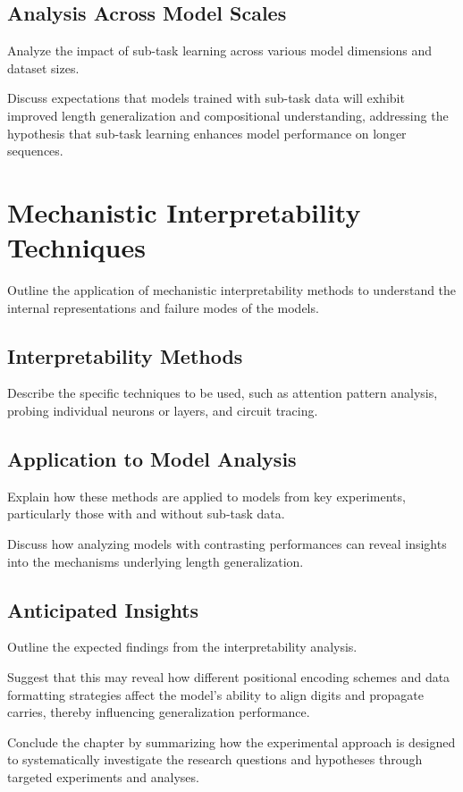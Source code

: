 \subsection{Analysis Across Model Scales}
Analyze the impact of sub-task learning across various model dimensions and dataset sizes.

Discuss expectations that models trained with sub-task data will exhibit improved length generalization and compositional understanding, addressing the hypothesis that sub-task learning enhances model performance on longer sequences.

\section{Mechanistic Interpretability Techniques}
\label{sec:mechanistic_interpretability}
Outline the application of mechanistic interpretability methods to understand the internal representations and failure modes of the models.

\subsection{Interpretability Methods}
Describe the specific techniques to be used, such as attention pattern analysis, probing individual neurons or layers, and circuit tracing.

\subsection{Application to Model Analysis}
Explain how these methods are applied to models from key experiments, particularly those with and without sub-task data.

Discuss how analyzing models with contrasting performances can reveal insights into the mechanisms underlying length generalization.

\subsection{Anticipated Insights}
Outline the expected findings from the interpretability analysis.

Suggest that this may reveal how different positional encoding schemes and data formatting strategies affect the model's ability to align digits and propagate carries, thereby influencing generalization performance.

Conclude the chapter by summarizing how the experimental approach is designed to systematically investigate the research questions and hypotheses through targeted experiments and analyses.


